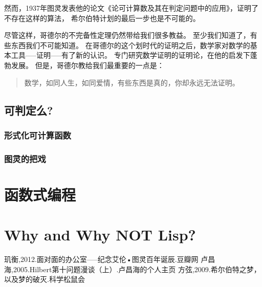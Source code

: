 \documentclass[12pt,a4paper]{ctexrep}
\begin{document}
然而，1937年图灵发表他的论文《论可计算数及其在判定问题中的应用》，证明了不存在这样的算法，
希尔伯特计划的最后一步也是不可能的。

尽管这样，哥德尔的不完备性定理仍然带给我们很多教益。
至少我们知道了，有些东西我们不可能知道。
在哥德尔的这个划时代的证明之后，数学家对数学的基本工具-----证明-----有了新的认识。
专门研究数学证明的证明论，在他的启发下蓬勃发展。
但是，哥德尔教给我们最重要的一点是\cite{dream}：

\begin{quote}
数学，如同人生，如同爱情，有些东西是真的，你却永远无法证明。
\end{quote}

\section{可判定么?}

\subsection{形式化可计算函数}


\subsection{图灵的把戏}

\chapter{函数式编程}

\chapter{Why and Why NOT Lisp?}

\begin{thebibliography}{99}
 玑衡,2012.面对面的办公室-----纪念艾伦•图灵百年诞辰.豆瓣网
 卢昌海,2005.Hilbert第十问题漫谈（上）.卢昌海的个人主页
 方弦,2009.希尔伯特之梦，以及梦的破灭.科学松鼠会
\end{thebibliography}
\end{document}
